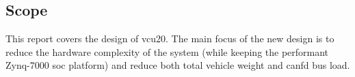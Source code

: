 \subsection{Scope}

This report covers the design of \acrfull{vcu20}. The main focus of the new design is to reduce the hardware complexity of the system (while keeping the performant Zynq-7000 \acrshort{soc} platform) and reduce both total vehicle weight and \acrshort{canfd} bus load. 










